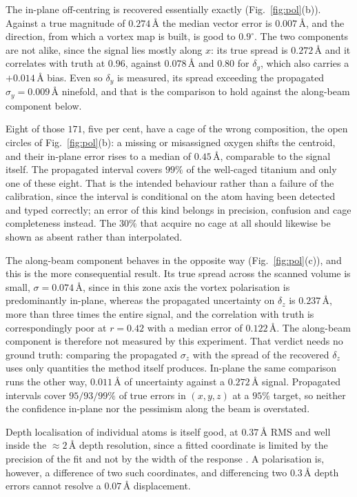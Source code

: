 \documentclass[aps,prb,twocolumn,superscriptaddress,floatfix,nofootinbib]{revtex4-2}
\begin{document}
The in-plane off-centring is recovered essentially exactly (Fig.~\ref{fig:pol}(b)). Against a true magnitude of $0.274$\,\AA{} the median vector error is $0.007$\,\AA, and the direction, from which a vortex map is built, is good to $0.9^\circ$. The two components are not alike, since the signal lies mostly along $x$: its true spread is $0.272$\,\AA{} and it correlates with truth at $0.96$, against $0.078$\,\AA{} and $0.80$ for $\delta_y$, which also carries a $+0.014$\,\AA{} bias. Even so $\delta_y$ is measured, its spread exceeding the propagated $\sigma_y=0.009$\,\AA{} ninefold, and that is the comparison to hold against the along-beam component below.

Eight of those $171$, five per cent, have a cage of the wrong composition, the open circles of Fig.~\ref{fig:pol}(b): a missing or misassigned oxygen shifts the centroid, and their in-plane error rises to a median of $0.45$\,\AA, comparable to the signal itself. The propagated interval covers $99\%$ of the well-caged titanium and only one of these eight. That is the intended behaviour rather than a failure of the calibration, since the interval is conditional on the atom having been detected and typed correctly; an error of this kind belongs in precision, confusion and cage completeness instead. The $30\%$ that acquire no cage at all should likewise be shown as absent rather than interpolated.

The along-beam component behaves in the opposite way (Fig.~\ref{fig:pol}(c)), and this is the more consequential result. Its true spread across the scanned volume is small, $\sigma=0.074$\,\AA, since in this zone axis the vortex polarisation is predominantly in-plane, whereas the propagated uncertainty on $\delta_z$ is $0.237$\,\AA, more than three times the entire signal, and the correlation with truth is correspondingly poor at $r=0.42$ with a median error of $0.122$\,\AA. The along-beam component is therefore not measured by this experiment. That verdict needs no ground truth: comparing the propagated $\sigma_z$ with the spread of the recovered $\delta_z$ uses only quantities the method itself produces. In-plane the same comparison runs the other way, $0.011$\,\AA{} of uncertainty against a $0.272$\,\AA{} signal. Propagated intervals cover $95/93/99\%$ of true errors in $(x,y,z)$ at a $95\%$ target, so neither the confidence in-plane nor the pessimism along the beam is overstated.

Depth localisation of individual atoms is itself good, at $0.37$\,\AA{} RMS and well inside the $\approx2$\,\AA{} depth resolution, since a fitted coordinate is limited by the precision of the fit and not by the width of the response \citep{DeBacker2016}. A polarisation is, however, a difference of two such coordinates, and differencing two $0.3$\,\AA{} depth errors cannot resolve a $0.07$\,\AA{} displacement.
\end{document}
